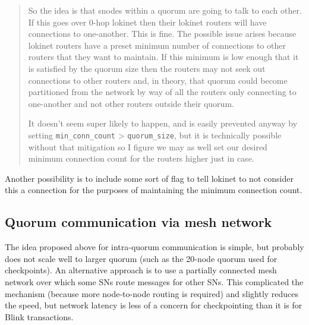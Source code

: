 \begin{quote}
So the idea is that snodes within a quorum are going to talk to each
other. If this goes over 0-hop lokinet then their lokinet routers will
have connections to one-another. This is fine. The possible issue arises
because lokinet routers have a preset minimum number of connections to
other routers that they want to maintain. If this minimum is low enough
that it is satisfied by the quorum size then the routers may not seek
out connections to other routers and, in theory, that quorum could
become partitioned from the network by way of all the routers only
connecting to one-another and not other routers outside their quorum.

It doesn't seem super likely to happen, and is easily prevented anyway
by setting \texttt{min\_conn\_count} \textgreater{}
\texttt{quorum\_size}, but it is technically possible without that
mitigation so I figure we may as well set our desired minimum connection
count for the routers higher just in case.
\end{quote}

Another possibility is to include some sort of flag to tell lokinet to
not consider this a connection for the purposes of maintaining the
minimum connection count.

\hypertarget{quorum-communication-via-mesh-network}{%
\subsection{Quorum communication via mesh
network}\label{quorum-communication-via-mesh-network}}

The idea proposed above for intra-quorum communication is simple, but
probably does not scale well to larger quorum (such as the 20-node
quorum used for checkpoints). An alternative approach is to use a
partially connected mesh network over which some SNs route messages for
other SNs. This complicated the mechanism (because more node-to-node
routing is required) and slightly reduces the speed, but network latency
is less of a concern for checkpointing than it is for Blink
transactions.
